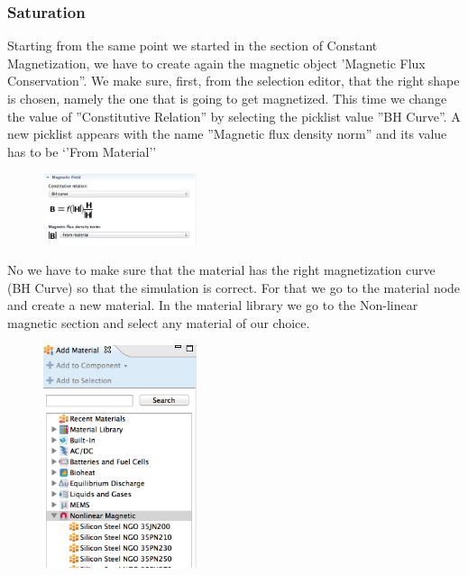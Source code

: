 \subsubsection{Saturation}

Starting from the same point we started in the section of Constant Magnetization, we have to create again the magnetic object 'Magnetic Flux Conservation''. We make sure, first, from the selection editor, that the right shape is chosen, namely the one that is going to get magnetized. This time we change the value of ''Constitutive Relation'' by selecting the picklist value ''BH Curve''. A new picklist appears with the name ''Magnetic flux density norm'' and its value has to be `'From Material''

\begin{figure}[H]
	\centering
  \includegraphics[width=0.4\textwidth]{Pictures/Screenshots/Sim12.png}
\end{figure}

No we have to make sure that the material has the right magnetization curve (BH Curve) so that the simulation is correct. For that we go to the material node and create a new material. In the material library we go to the Non-linear magnetic section and select any material of our choice.\\

 \begin{figure}[H]
	\centering
  \includegraphics[width=0.4\textwidth]{Pictures/Screenshots/Sim16.png}
\end{figure} 

